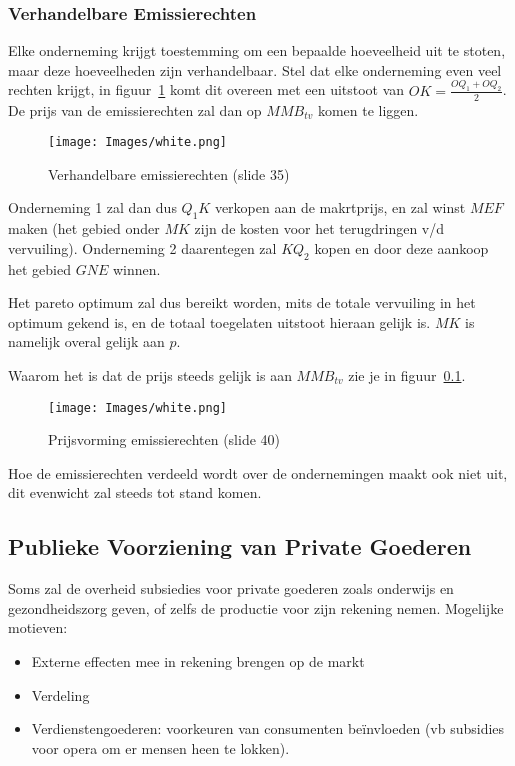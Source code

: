 \subsubsection{Verhandelbare Emissierechten}
Elke onderneming krijgt toestemming om een bepaalde hoeveelheid uit te stoten, maar deze hoeveelheden zijn verhandelbaar. Stel dat elke onderneming even veel rechten krijgt, in figuur~\ref{fig:verhandelbareEmissierechten} komt dit overeen met een uitstoot van $OK = \frac{OQ_1 + OQ_2}{2}$. De prijs van de emissierechten zal dan op $MMB_{tv}$ komen te liggen.
\begin{figure}[htbp]
   \centering
   \texttt{[image: Images/white.png]}
   \caption{Verhandelbare emissierechten (slide 35)}
   \label{fig:verhandelbareEmissierechten}
\end{figure}
Onderneming 1 zal dan dus $Q_1K$ verkopen aan de makrtprijs, en zal winst $MEF$ maken (het gebied onder $MK$ zijn de kosten voor het terugdringen v/d vervuiling). Onderneming 2 daarentegen zal $KQ_2$ kopen en door deze aankoop het gebied $GNE$ winnen.

Het pareto optimum zal dus bereikt worden, mits de totale vervuiling in het optimum gekend is, en de totaal toegelaten uitstoot hieraan gelijk is. $MK$ is namelijk overal gelijk aan $p$.

Waarom het is dat de prijs steeds gelijk is aan $MMB_{tv}$ zie je in figuur~\ref{}.

\begin{figure}[htbp]
   \centering
   \texttt{[image: Images/white.png]}
   \caption{Prijsvorming emissierechten (slide 40)}
   \label{fig:prijsvormingEmissierechten}
\end{figure}

Hoe de emissierechten verdeeld wordt over de ondernemingen maakt ook niet uit, dit evenwicht zal steeds tot stand komen.

\subsection{Publieke Voorziening van Private Goederen}
Soms zal de overheid subsiedies voor private goederen zoals onderwijs en gezondheidszorg geven, of zelfs de productie voor zijn rekening nemen. Mogelijke motieven:
\begin{itemize}
   \item Externe effecten mee in rekening brengen op de markt
   \item Verdeling
   \item Verdienstengoederen: voorkeuren van consumenten be\"invloeden (vb subsidies voor opera om er mensen heen te lokken).
\end{itemize}
